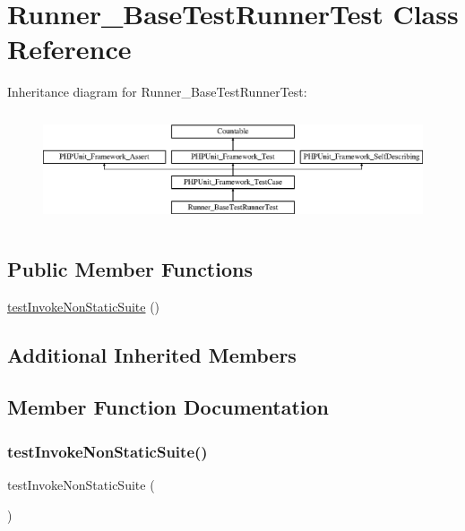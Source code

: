 \hypertarget{class_runner___base_test_runner_test}{}\section{Runner\+\_\+\+Base\+Test\+Runner\+Test Class Reference}
\label{class_runner___base_test_runner_test}
Inheritance diagram for Runner\+\_\+\+Base\+Test\+Runner\+Test\+:\begin{figure}[H]
\begin{center}
\leavevmode
\includegraphics[height=3.303835cm]{class_runner___base_test_runner_test}
\end{center}
\end{figure}
\subsection*{Public Member Functions}
\begin{DoxyCompactItemize}
\item 
\mbox{\hyperlink{class_runner___base_test_runner_test_ab3fdd5bfe85188afe072a13404e0661c}{test\+Invoke\+Non\+Static\+Suite}} ()
\end{DoxyCompactItemize}
\subsection*{Additional Inherited Members}


\subsection{Member Function Documentation}
\mbox{\label{class_runner___base_test_runner_test_ab3fdd5bfe85188afe072a13404e0661c}} 
\subsubsection{\texorpdfstring{test\+Invoke\+Non\+Static\+Suite()}{testInvokeNonStaticSuite()}}
{\footnotesize\ttfamily test\+Invoke\+Non\+Static\+Suite (\begin{DoxyParamCaption}{ }\end{DoxyParamCaption})}



